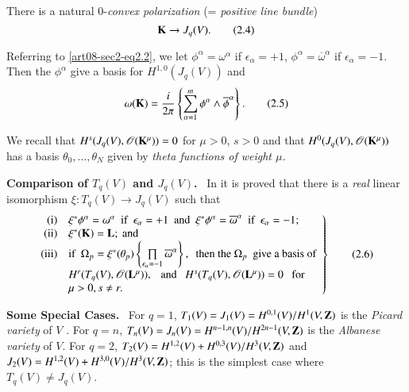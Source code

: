 There is a natural $0$-{\em convex polarization} (= {\em positive line bundle})
\begin{equation*}
\mathbf{K}\to J_{q}(V).\tag{2.4}\label{art08-sec2-eq2.4}
\end{equation*}

Referring to \eqref{art08-sec2-eq2.2}, we let $\phi^{\alpha}=\omega^{\alpha}$ if $\epsilon_{\alpha}=+1$, $\phi^{\alpha}=\overline{\omega}^{\alpha}$ if $\epsilon_{\alpha}=-1$. Then the $\phi^{\alpha}$ give a basis for $H^{1,0}(J_{q}(V))$ and
\begin{equation*}
\omega (\mathbf{K})=\dfrac{i}{2\pi}\left\{\sum\limits^{m}_{\alpha=1}\phi^{\alpha}\wedge \overline{\phi}^{\alpha}\right\}.\tag{2.5}\label{art08-sec2-eq2.5}
\end{equation*}

We recall \cite{art08-key23} that $H^{s}(J_{q}(V),\mathscr{O}(\mathbf{K}^{\mu}))=0$ for $\mu>0$, $s>0$ and that $H^{0}(J_{q}(V),\mathscr{O}(\mathbf{K}^{\mu}))$ has a basis $\theta_{0},\ldots,\theta_{N}$ given by {\em theta functions of weight $\mu$.}

\medskip
\noindent
{\bf Comparison of \boldmath$T_{q}(V)$ and $J_{q}(V)$.}~ In \cite{art08-key9} it is proved that there is a {\em real} linear isomorphism $\xi:T_{q}(V)\to J_{q}(V)$ such that
\begin{equation*}
\left.
\begin{array}[l]{@{}rl}
{\rm(i)} & \xi^{*}\phi^{\alpha}=\omega^{\alpha}\text{~ if~ } \epsilon_{\alpha}=+1\text{~ and~ } \xi^{*}\phi^{\alpha}=\overline{\omega}^{\alpha}\text{~ if~ } \epsilon_{\alpha}=-1;\\
{\rm(ii)} & \xi^{*}(\bfK)=\bfL;~ \text{and}\\
{\rm(iii)} & \text{if~~} \Omega_{p}=\xi^{*}(\theta_{p})\left\{\prod\limits_{\epsilon_{\alpha}=-1}\overline{\omega}^{\alpha}\right\}, \text{~ then the } \Omega_{p}\text{~ give a basis of}\\
 & H^{r}(T_{q}(V),\mathscr{O}(\bfL^{\mu})),\text{~~ and~~ }H^{s}(T_{q}(V),\mathscr{O}(\bfL^{\mu}))=0\text{~~ for}\\
& \mu>0, s\neq r.
\end{array}
\right\}\tag{2.6}\label{art08-sec2-eq2.6}
\end{equation*}

\noindent
{\bf Some Special Cases.}~ For $q=1$, $T_{1}(V)=J_{1}(V)=H^{0,1}(V)/H^{1}(V,\mathbf{Z})$ is the {\em Picard variety} of $V$ \cite{art08-key22}. For $q=n$, $T_{n}(V)=J_{n}(V)=H^{n-1,n}(V)\break /H^{2n-1}(V,\bfZ)$ is the {\em Albanese variety} \cite{art08-key3} of $V$. For $q=2$, $T_{2}(V)=H^{1,2}(V)+H^{0,3}(V)/H^{3}(V,\mathbf{Z})$ and $J_{2}(V)=H^{1,2}(V)+H^{3,0}(V)/H^{3}(V,\mathbf{Z})$; this is the simplest case where $T_{q}(V)\neq J_{q}(V)$.

